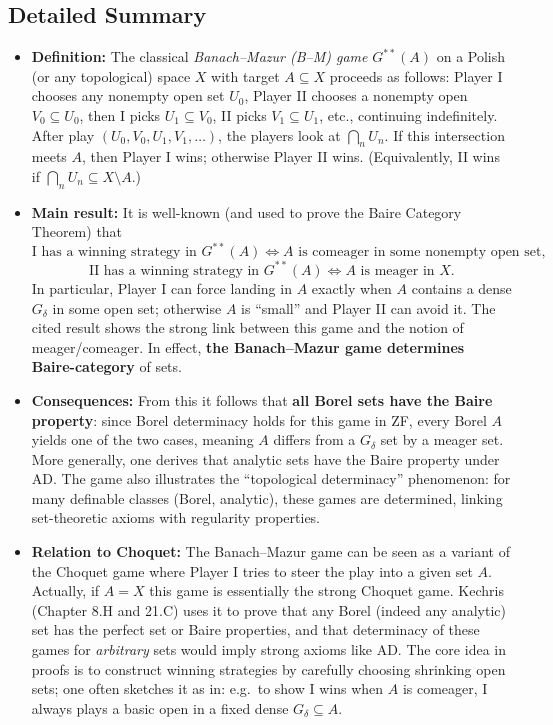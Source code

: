 \documentclass[11pt]{article}
\begin{document}
\subsection{Detailed Summary}
\label{detailed-summary-3}
\begin{itemize}
\item \textbf{Definition:} The classical \emph{Banach--Mazur (B--M) game} \(G^{**}(A)\)
on a Polish (or any topological) space \(X\) with target
\(A\subseteq X\) proceeds as follows: Player I chooses any nonempty
open set \(U_0\), Player II chooses a nonempty open
\(V_0\subseteq U_0\), then I picks \(U_1\subseteq V_0\), II picks
\(V_1\subseteq U_1\), etc., continuing indefinitely. After play
\((U_0,V_0,U_1,V_1,\dots)\), the players look at \(\bigcap_n U_n\). If
this intersection meets \(A\), then Player I wins; otherwise Player II
wins. (Equivalently, II wins if
\(\bigcap_n U_n\subseteq X\setminus A\).)

\item \textbf{Main result:} It is well-known (and used to prove the Baire Category
Theorem) that
\[\text{I has a winning strategy in }G^{**}(A)\iff A\text{ is comeager in some nonempty open set,}\]
\[\text{II has a winning strategy in }G^{**}(A)\iff A\text{ is meager in }X.\]
In particular, Player I can force landing in \(A\) exactly when \(A\)
contains a dense \(G_\delta\) in some open set; otherwise \(A\) is
“small” and Player II can avoid it. The cited result shows the strong
link between this game and the notion of meager/comeager. In effect,
\textbf{the Banach--Mazur game determines Baire-category} of sets.

\item \textbf{Consequences:} From this it follows that \textbf{all Borel sets have the
Baire property}: since Borel determinacy holds for this game in ZF,
every Borel \(A\) yields one of the two cases, meaning \(A\) differs
from a \(G_\delta\) set by a meager set. More generally, one derives
that analytic sets have the Baire property under AD. The game also
illustrates the “topological determinacy” phenomenon: for many
definable classes (Borel, analytic), these games are determined,
linking set-theoretic axioms with regularity properties.

\item \textbf{Relation to Choquet:} The Banach--Mazur game can be seen as a variant
of the Choquet game where Player I tries to steer the play into a
given set \(A\). Actually, if \(A=X\) this game is essentially the
strong Choquet game. Kechris (Chapter 8.H and 21.C) uses it to prove
that any Borel (indeed any analytic) set has the perfect set or Baire
properties, and that determinacy of these games for \emph{arbitrary} sets
would imply strong axioms like AD. The core idea in proofs is to
construct winning strategies by carefully choosing shrinking open
sets; one often sketches it as in: e.g. to show I wins when \(A\) is
comeager, I always plays a basic open in a fixed dense
\(G_\delta\subseteq A\).
\end{itemize}
\end{document}
